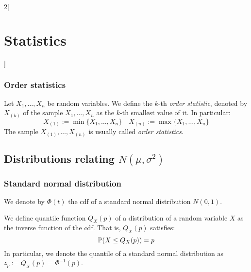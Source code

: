 \documentclass[../../../main.tex]{subfiles}
\begin{document}
\begin{multicols}{2}[\section{Statistics}]
  \subsubsection{Order statistics}
  \begin{definition}
    Let $X_1,\ldots,X_n$ be random variables. We define the $k$-th \emph{order statistic}, denoted by $X_{(k)}$ of the sample $X_1,\ldots,X_n$ as the $k$-th smallest value of it. In particular:
    $$X_{(1)}:=\min\{X_1,\ldots,X_n\}\quad X_{(n)}:=\max\{X_1,\ldots,X_n\}$$
    The sample $X_{(1)},\ldots,X_{(n)}$ is usually called \emph{order statistics}.
  \end{definition}
  \subsection{Distributions relating \texorpdfstring{$N(\mu,\sigma^2)$}{N(mu,sigma2)}}
  \subsubsection{Standard normal distribution}
  \begin{definition}
    We denote by $\Phi(t)$ the cdf of a standard normal distribution $N(0,1)$.
  \end{definition}
  \begin{definition}[Quantile]\label{STA_quantile}
    We define quantile function $Q_X(p)$ of a distribution of a random variable $X$ as the inverse function of the cdf. That is, $Q_X(p)$ satisfies:
    $$\mathbb{P}(X\leq Q_X(p))=p$$
    In particular, we denote the quantile of a standard normal distribution as $z_p:=Q_X(p)=\Phi^{-1}(p)$.
  \end{definition}

\end{multicols}
\end{document}
